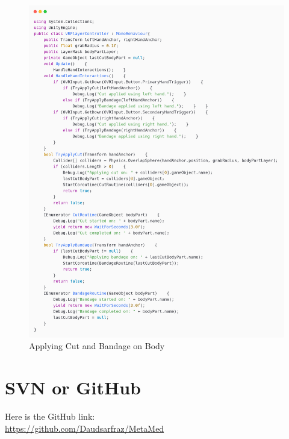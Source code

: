 \begin{figure}[h] 
	\centering
	\includegraphics[width=1\textwidth, height=0.7\textheight]{Images/Applying Cut and Bandage on Body.png}
	\caption{Applying Cut and Bandage on Body}
	\label{fig:Applying Cut and Bandage on Body}
\end{figure}
\section{SVN or GitHub}
 Here is the GitHub link: \\
\href{https://github.com/Daudsarfraz/MetaMed}{https://github.com/Daudsarfraz/MetaMed}
